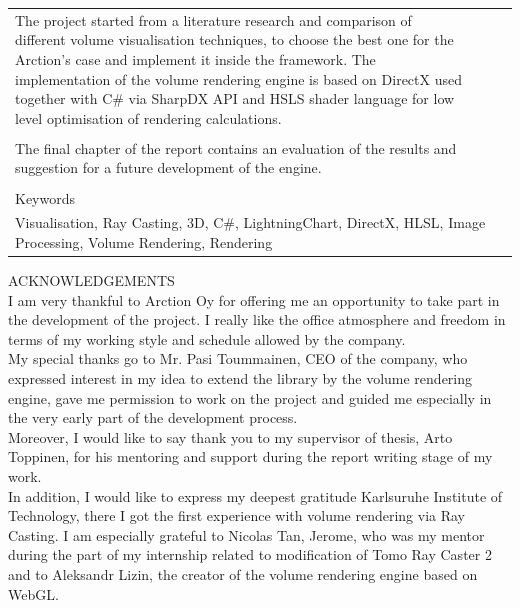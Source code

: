 \documentclass[english, 11pt]{report}
\begin{document}
\begin{table}[!h]
\begin{tabular}{| l | l | l | l |}
{The project started from a literature research and comparison of different volume visualisation techniques, to choose the best one for the Arction's case and implement it inside the framework. The implementation of the volume rendering engine is based on DirectX used together with C\# via SharpDX API and HSLS shader language for low level optimisation of rendering calculations.
}\\
\multicolumn{4}{|l|}{ }\\
\multicolumn{4}{|p{14cm}|}{
The final chapter of the report contains an evaluation of the results and suggestion for a future development of the engine.
}\\
\multicolumn{4}{|l|}{ }\\
\hline
\multicolumn{4}{|l|}{Keywords}\\
\multicolumn{4}{|p{14cm}|}{
Visualisation, Ray Casting, 3D, C\#, LightningChart, DirectX, HLSL, Image Processing, Volume Rendering, Rendering
}\\
\hline
\end{tabular}
\end{table}

\newpage

ACKNOWLEDGEMENTS\\

I am very thankful to Arction Oy for offering me an opportunity to take part in the development of the project. I really like the office atmosphere and freedom in terms of my working style and schedule allowed by the company.\\

My special thanks go to Mr. Pasi Toummainen, CEO of the company, who expressed interest in my idea to extend the library by the volume rendering engine, gave me permission to work on the project and guided me especially in the very early part of the development process.\\

Moreover, I would like to say thank you to my supervisor of thesis, Arto Toppinen, for his mentoring and support during the report writing stage of my work. \\

In addition, I would like to express my deepest gratitude Karlsuruhe Institute of Technology, there I got the first experience with volume rendering via Ray Casting. I am especially grateful to Nicolas Tan, Jerome, who was my mentor during the part of my internship related to modification of Tomo Ray Caster 2 and to Aleksandr Lizin, the creator of the volume rendering engine based on WebGL.
\end{document}
